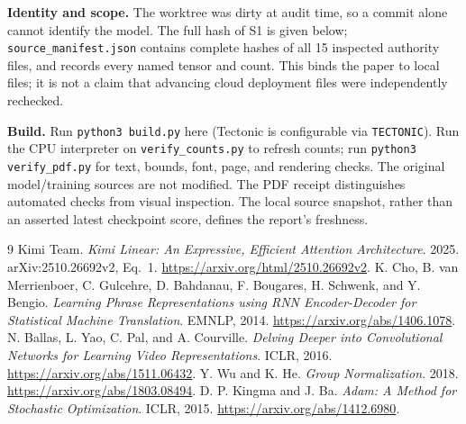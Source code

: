 \documentclass[10pt,letterpaper]{article}
\begin{document}
\textbf{Identity and scope.} The worktree was dirty at audit time, so a commit alone cannot identify the model. The full hash of S1 is given below; \texttt{source\_manifest.json} contains complete hashes of all 15 inspected authority files, and  records every named tensor and count. This binds the paper to local files; it is not a claim that advancing cloud deployment files were independently rechecked.
\begin{center}\footnotesize\texttt{}\end{center}
\textbf{Build.} Run \texttt{python3 build.py} here (Tectonic is configurable via \texttt{TECTONIC}). Run the CPU interpreter on \texttt{verify\_counts.py} to refresh counts; run \texttt{python3 verify\_pdf.py} for text, bounds, font, page, and rendering checks. The original model/training sources are not modified. The PDF receipt distinguishes automated checks from visual inspection. The local source snapshot, rather than an asserted latest checkpoint score, defines the report's freshness.

\vspace{-7pt}
\begin{thebibliography}{9}\setlength{\itemsep}{1pt}
 Kimi Team. \emph{Kimi Linear: An Expressive, Efficient Attention Architecture}. 2025. arXiv:2510.26692v2, Eq.~1. \url{https://arxiv.org/html/2510.26692v2}.
 K. Cho, B. van Merrienboer, C. Gulcehre, D. Bahdanau, F. Bougares, H. Schwenk, and Y. Bengio. \emph{Learning Phrase Representations using RNN Encoder-Decoder for Statistical Machine Translation}. EMNLP, 2014. \url{https://arxiv.org/abs/1406.1078}.
 N. Ballas, L. Yao, C. Pal, and A. Courville. \emph{Delving Deeper into Convolutional Networks for Learning Video Representations}. ICLR, 2016. \url{https://arxiv.org/abs/1511.06432}.
 Y. Wu and K. He. \emph{Group Normalization}. 2018. \url{https://arxiv.org/abs/1803.08494}.
 D. P. Kingma and J. Ba. \emph{Adam: A Method for Stochastic Optimization}. ICLR, 2015. \url{https://arxiv.org/abs/1412.6980}.
\end{thebibliography}
\end{document}
